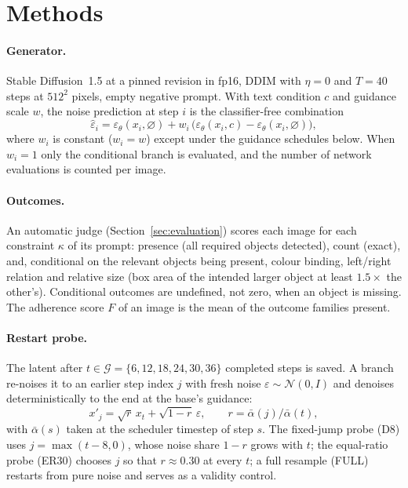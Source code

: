 \section{Methods}\label{sec:methods}
\paragraph{Generator.} Stable Diffusion~1.5 \citep{rombach2022ldm} at a pinned revision in fp16, DDIM \citep{song2021ddim} with $\eta=0$ and $T=40$ steps at $512^2$ pixels, empty negative prompt. With text condition $c$ and guidance scale $w$, the noise prediction at step $i$ is the classifier-free combination \citep{ho2022cfg}
\begin{equation}
\hat\varepsilon_i = \varepsilon_\theta(x_i,\varnothing) + w_i\,\big(\varepsilon_\theta(x_i,c)-\varepsilon_\theta(x_i,\varnothing)\big),
\end{equation}
where $w_i$ is constant ($w_i=w$) except under the guidance schedules below. When $w_i=1$ only the conditional branch is evaluated, and the number of network evaluations is counted per image.

\paragraph{Outcomes.} An automatic judge (Section~\ref{sec:evaluation}) scores each image for each constraint $\kappa$ of its prompt: presence (all required objects detected), count (exact), and, conditional on the relevant objects being present, colour binding, left/right relation and relative size (box area of the intended larger object at least $1.5\times$ the other's). Conditional outcomes are undefined, not zero, when an object is missing. The adherence score $F$ of an image is the mean of the outcome families present.

\paragraph{Restart probe.} The latent after $t\in\mathcal{G}=\{6,12,18,24,30,36\}$ completed steps is saved. A branch re-noises it to an earlier step index $j$ with fresh noise $\varepsilon\sim\mathcal{N}(0,I)$ and denoises deterministically to the end at the base's guidance:
\begin{equation}
x'_j=\sqrt{r}\,x_t+\sqrt{1-r}\,\varepsilon,\qquad r=\bar\alpha(j)/\bar\alpha(t),
\end{equation}
with $\bar\alpha(s)$ taken at the scheduler timestep of step $s$. The fixed-jump probe (D8) uses $j=\max(t-8,0)$, whose noise share $1-r$ grows with $t$; the equal-ratio probe (ER30) chooses $j$ so that $r\approx0.30$ at every $t$; a full resample (FULL) restarts from pure noise and serves as a validity control.

